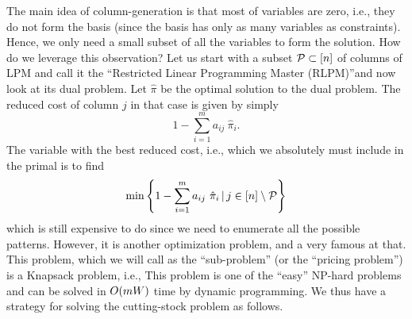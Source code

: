 \documentclass[letterpaper, 10pt, twocolumn, reqno]{amsart}
\begin{document}
The main idea of column-generation is that most of variables are zero, i.e., they do not form the basis (since the basis has only as many variables as constraints). Hence, we only need a small subset of all the variables to form the solution. How do we leverage this observation? Let us start with a subset $\mathcal{P} \subset [n]$ of columns of LPM and call it the ``Restricted Linear Programming Master (RLPM)''and now look at its dual problem.
Let $\hat{\pi}$ be the optimal solution to the dual problem. The reduced cost of column $j$ in that case is given by simply
$$
1  - \sum_{i=1}^m a_{ij}\ \hat{\pi}_i.
$$
The variable with the best reduced cost, i.e., which we absolutely must include in the primal is to find
$$
\min \left\{1  - \sum_{i=1}^m a_{ij}\ \hat{\pi}_i \, \vert \, j \in [n] \setminus \mathcal{P}\right\}
$$
which is still expensive to do since we need to enumerate all the possible patterns. However, it is another optimization problem, and a very famous at that. This problem, which we will call as the ``sub-problem'' (or the ``pricing problem'') is a Knapsack problem, i.e.,
This problem is one of the ``easy'' NP-hard problems and can be solved in $O(mW)$ time by dynamic programming. We thus have a strategy for solving the cutting-stock problem as follows.
\end{document}

